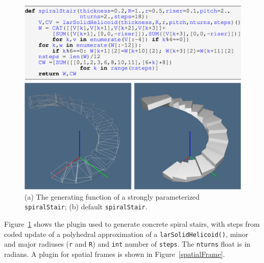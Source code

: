 \begin{figure}[t] %
   \centering
   \includegraphics[width=\linewidth]{images/spiralstair}
   
   \includegraphics[width=\linewidth]{images/spiralstair2}
   \caption{(a) The generating function of a strongly parameterized \texttt{spiralStair}; (b) default \texttt{spiralStair}.}
   \label{spiralstair}
\end{figure}

\noindent
Figure~\ref{spiralstair} shows the plugin used to generate concrete spiral stairs, with steps from coded update of a polyhedral approximation of a \texttt{larSolidHelicoid()},  minor and major radiuses (\texttt{r} and \texttt{R}) and \texttt{int} number of \texttt{steps}. The \texttt{nturns} float is in radians. A plugin for spatial frames is shown in Figure~\ref{spatialFrame}.


